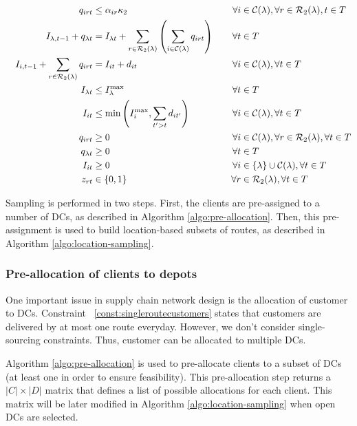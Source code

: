 \documentclass[a4paper,10pt]{article}
\begin{document}
\begin{linenumbers}
\begin{alignat}{3}
	&&q_{irt}   		&\leq \alpha_{ir}\kappa_2  														&\forall i&\in\mathcal{C}(\lambda), \forall r\in \mathcal{R}_2(\lambda), t\in T\label{const:decomp_deliveryConstLoc}\\
	&&I_{\lambda,t-1} + q_{\lambda t}   			&=I_{\lambda t} +\sum_{r\in \mathcal{R}_2(\lambda)}\left( \sum_{i\in \mathcal{C}(\lambda)}q_{irt}\right)\quad 			&\forall t& \in T \label{const:decomp_invflowdepots}\\
	&&I_{i,t-1}+\sum_{r\in \mathcal{R}_2(\lambda)} q_{irt} &= I_{it} +d_{it} 							&\forall i&\in \mathcal{C}(\lambda), \forall t\in T\label{const:decomp_dinvflowcustomers}\\
	&&I_{\lambda t}					&\leq I_\lambda^{\max}  									&\forall t&\in T\label{const:decomp_invdepotUB}\\	
	&&I_{it} 					&\leq \min\left(I_i^{\max}, \sum_{t' > t}d_{it'}\right)											&\forall i&\in \mathcal{C}(\lambda), \forall t\in T\label{const:decomp_invcustUB}\\
	&&q_{irt}			&\geq 0 															&\forall i&\in \mathcal{C}(\lambda), \forall r\in \mathcal{R}_2(\lambda),\forall t \in T\label{const:decomp_qpos}	\\
	&&q_{\lambda t}			&\geq 0 															&\forall t&\in T\label{const:decomp_qdcpos}	\\
	&&I_{it}			&\geq 0 															&\forall i &\in \{\lambda\}\cup \mathcal{C}(\lambda), \forall t\in T\label{const:decomp_invCpos}	\\
	&&z_{rt}					&\in \{0,1\} 														&\forall r&\in \mathcal{R}_2(\lambda), \forall t\in T\label{const:decomp_zbool}
\end{alignat}


Sampling is performed in two steps.
First, the clients are pre-assigned to a number of DCs, as described in Algorithm \ref{algo:pre-allocation}.
Then, this pre-assignment is used to build location-based subsets of routes, as described in Algorithm \ref{algo:location-sampling}.

\subsubsection{Pre-allocation of clients to depots}

One important issue in supply chain network design is the allocation of customer to DCs. 
Constraint ~\eqref{const:singleroutecustomers} states that customers are delivered by at most one route everyday. However, we don't consider single-sourcing constraints. Thus, customer can be allocated to multiple DCs. 

Algorithm \ref{algo:pre-allocation} is used to pre-allocate clients to a subset of DCs (at least one in order to ensure feasibility). 
This pre-allocation step returns a $|C| \times |D|$ matrix that defines a list of possible allocations for each client. 
This matrix will be later modified in Algorithm \ref{algo:location-sampling} when open DCs are selected. 


\end{linenumbers}
\end{document}
